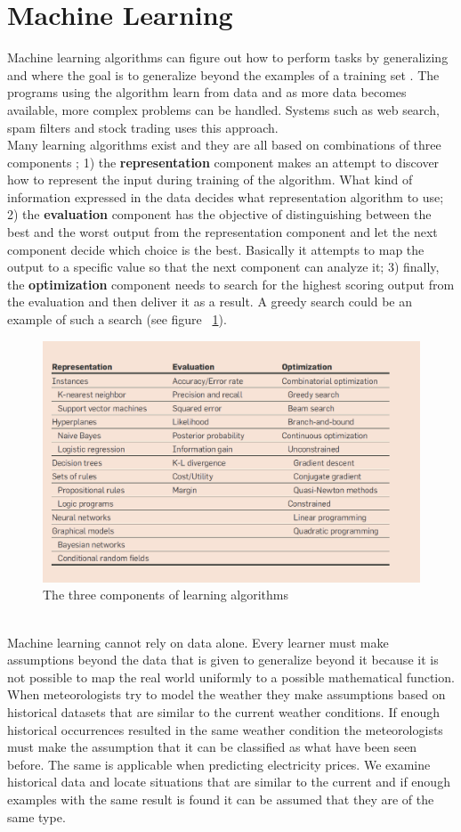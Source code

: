 \documentclass[twoside,11pt,openright]{report}
\begin{document}
\section{Machine Learning}
Machine learning algorithms can figure out how to perform tasks by generalizing and where the goal is to generalize beyond the examples of a training set \cite{18}. The programs using the algorithm learn from data and as more data becomes available, more complex problems can be handled. Systems such as web search, spam filters and stock trading uses this approach.
\\[0.5cm]
Many learning algorithms exist and they are all based on combinations of three components \cite{18}; 1) the \textbf{representation} component makes an attempt to discover how to represent the input during training of the algorithm. What kind of information expressed in the data decides what representation algorithm to use; 2) the \textbf{evaluation} component has the objective of distinguishing between the best and the worst output from the representation component and let the next component decide which choice is the best. Basically it attempts to map the output to a specific value so that the next component can analyze it; 3) finally, the \textbf{optimization} component needs to search for the highest scoring output from the evaluation and then deliver it as a result. A greedy search could be an example of such a search (see figure ~\ref{fig:threeComponents}).
\begin{figure}[h!]
\centering
\includegraphics[width=0.6\linewidth,natwidth=898,natheight=587]{billeder/Table1-TheComponentsOfLearningAlgorithms.png}
\caption{The three components of learning algorithms \cite{18}}
\label{fig:threeComponents}
\end{figure}
\\[0.5cm] 
Machine learning cannot rely on data alone. Every learner must make assumptions beyond the data that is given to generalize beyond it \cite{18} because it is not possible to map the real world uniformly to a possible mathematical function. When meteorologists try to model the weather they make assumptions based on historical datasets that are similar to the current weather conditions. If enough historical occurrences resulted in the same weather condition the meteorologists must make the assumption that it can be classified as what have been seen before. The same is applicable when predicting electricity prices. We examine historical data and locate situations that are similar to the current and if enough examples with the same result is found it can be assumed that they are of the same type.
\end{document}
